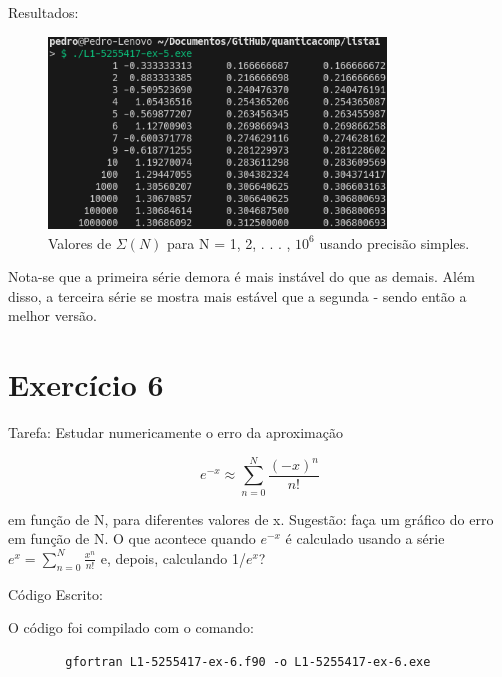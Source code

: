 \documentclass[12pt, a4paper]{article} %
\begin{document}
    Resultados:
    \begin{figure}[H]
        \centering
        \includegraphics[width=0.8\textwidth]{../images/results-ex5.png}
        \caption{Valores de $\Sigma (N)$ para N = 1, 2, . . . , $10^6$ usando precis\~ao simples.}
    \end{figure}

    Nota-se que a primeira s\'erie demora \'e mais inst\'avel do que as demais. Al\'em disso, a terceira s\'erie se mostra mais est\'avel que a segunda - sendo ent\~ao a melhor vers\~ao.

\section{Exerc\'icio 6}

    Tarefa: Estudar numericamente o erro da aproxima\c{c}\~ao

    \begin{equation} e^{-x} \approx \sum_{n=0}^N \frac{(-x)^n}{n!} \end{equation}

    em fun\c{c}\~ao de N, para diferentes valores de x. Sugest\~ao: fa\c{c}a um gr\'afico do erro em fun\c{c}\~ao de N. O que acontece quando $e^{-x}$  \'e calculado usando a s\'erie $e^x = \sum_{n=0}^{N} \frac{x^n}{n!}$ e, depois, calculando 1/$e^x$?

    C\'odigo Escrito:
    

    O c\'odigo foi compilado com o comando:
    \begin{verbatim}
        gfortran L1-5255417-ex-6.f90 -o L1-5255417-ex-6.exe
    \end{verbatim}
\end{document}
